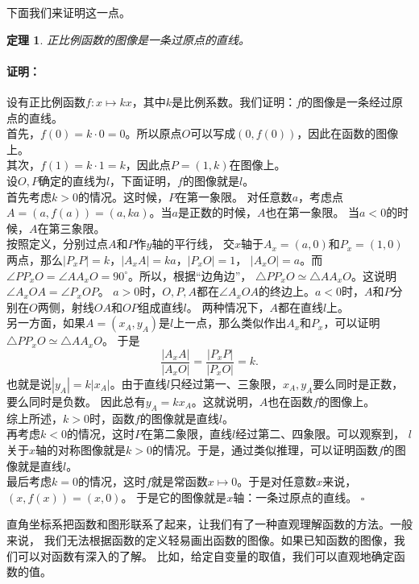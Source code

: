 \documentclass[12pt,UTF8]{ctexbook}
\newtheorem{tm}{定理}[section]
\newenvironment{proof2}{\paragraph{\textbf{证明：}}}{\hfill$\square$}
\begin{document}
下面我们来证明这一点。

\begin{tm}\label{tm:5-0-0}
    正比例函数的图像是一条过原点的直线。
\end{tm}
\begin{proof2}
    设有正比例函数$f: x \mapsto kx$，其中$k$是比例系数。我们证明：$f$的图像是一条经过原点的直线。\\
    首先，$f(0) = k\cdot 0 = 0$。所以原点$O$可以写成$(0, f(0))$，因此在函数的图像上。\\
    其次，$f(1) = k\cdot 1 = k$，因此点$P = (1, k)$在图像上。\\
    设$O,P$确定的直线为$l$，下面证明，$f$的图像就是$l$。\\
    首先考虑$k > 0$的情况。这时候，$P$在第一象限。
    对任意数$a$，考虑点$A = (a, f(a)) = (a, ka)$。当$a$是正数的时候，$A$也在第一象限。
    当$a < 0$的时候，$A$在第三象限。\\
    按照定义，分别过点$A$和$P$作$y$轴的平行线，
    交$x$轴于$A_x = (a, 0)$和$P_x = (1, 0)$两点，那么$|P_xP| = k$，$|A_xA| = ka$，$|P_xO| = 1$，
    $|A_xO| = a$。而$\angle PP_xO = \angle AA_xO = 90^\circ$。所以，根据“边角边”，
    $\triangle PP_xO \simeq \triangle AA_xO$。这说明$\angle A_xOA = \angle P_xOP$。
    $a>0$时，$O,P,A$都在$\angle A_xOA$的终边上。$a<0$时，$A$和$P$分别在$O$两侧，射线$OA$和$OP$组成直线$l$。
    两种情况下，$A$都在直线$l$上。\\
    另一方面，如果$A = (x_A, y_A)$是$l$上一点，那么类似作出$A_x$和$P_x$，可以证明$\triangle PP_xO \simeq \triangle AA_xO$。
    于是
    $$ \frac{|A_xA|}{|A_xO|} = \frac{|P_xP|}{|P_xO|} = k.$$
    也就是说$|y_A| = k|x_A|$。由于直线$l$只经过第一、三象限，$x_A, y_A$要么同时是正数，要么同时是负数。
    因此总有$y_A = kx_A$。这就说明，$A$也在函数$f$的图像上。\\
    综上所述，$k>0$时，函数$f$的图像就是直线$l$。\\
    再考虑$k<0$的情况，这时$P$在第二象限，直线$l$经过第二、四象限。可以观察到，
    $l$关于$x$轴的对称图像就是$k>0$的情况。于是，通过类似推理，可以证明函数$f$的图像就是直线$l$。\\
    最后考虑$k=0$的情况，这时$f$就是常函数$x\mapsto 0$。于是对任意数$x$来说，$(x, f(x)) = (x, 0)$。
    于是它的图像就是$x$轴：一条过原点的直线。
\end{proof2}

直角坐标系把函数和图形联系了起来，让我们有了一种直观理解函数的方法。一般来说，
我们无法根据函数的定义轻易画出函数的图像。如果已知函数的图像，我们可以对函数有深入的了解。
比如，给定自变量的取值，我们可以直观地确定函数的值。
\end{document}
